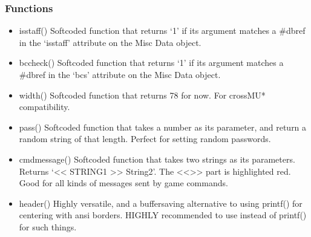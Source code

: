 \documentclass[letterpaper,10pt,english]{sphinxmanual}
\begin{document}
\subsubsection{Functions}
\label{\detokenize{gettingstarted:functions}}\begin{itemize}
\item {} 
\sphinxAtStartPar
isstaff() \sphinxhyphen{} Softcoded function that returns ‘1’ if its argument matches
a \#dbref in the ‘isstaff’ attribute on the Misc Data object.

\item {} 
\sphinxAtStartPar
bccheck() \sphinxhyphen{} Softcoded function that returns ‘1’ if its argument matches
a \#dbref in the ‘bcs’ attribute on the Misc Data object.

\item {} 
\sphinxAtStartPar
width() \sphinxhyphen{} Softcoded function that returns 78 for now. For cross\sphinxhyphen{}MU*
compatibility.

\item {} 
\sphinxAtStartPar
pass() \sphinxhyphen{} Softcoded function that takes a number as its parameter, and return
a random string of that length. Perfect for setting random passwords.

\item {} 
\sphinxAtStartPar
cmdmessage() \sphinxhyphen{} Softcoded function that takes two strings as its parameters.
Returns ‘\textless{}\textless{} STRING1 \textgreater{}\textgreater{} String2’. The \textless{}\textless{}\textgreater{}\textgreater{} part is highlighted red. Good for
all kinds of messages sent by game commands.

\item {} 
\sphinxAtStartPar
header() \sphinxhyphen{} Highly versatile, and a buffer\sphinxhyphen{}saving alternative
to using printf() for centering with ansi borders. HIGHLY recommended to use
instead of printf() for such things.

\end{itemize}
\end{document}
